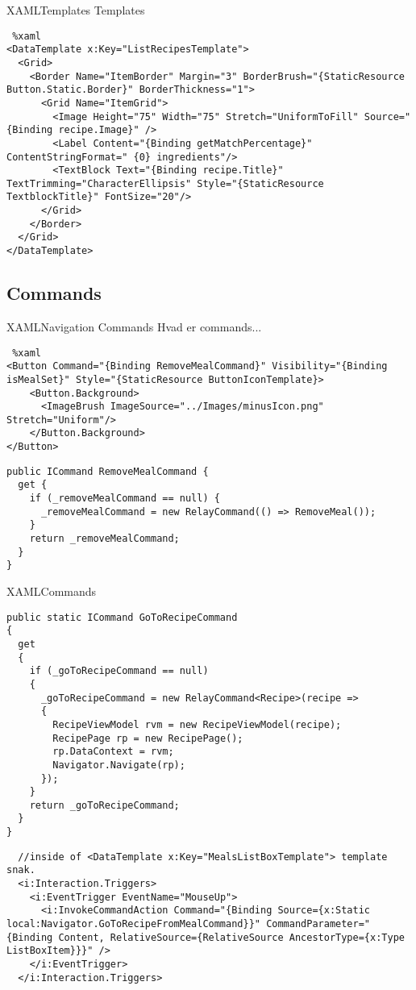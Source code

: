 \begin{frame}[fragile]{XAML}{Templates}
Templates
\begin{lstlisting} %xaml
<DataTemplate x:Key="ListRecipesTemplate">
  <Grid>
    <Border Name="ItemBorder" Margin="3" BorderBrush="{StaticResource Button.Static.Border}" BorderThickness="1">
      <Grid Name="ItemGrid">
        <Image Height="75" Width="75" Stretch="UniformToFill" Source="{Binding recipe.Image}" />
        <Label Content="{Binding getMatchPercentage}" ContentStringFormat=" {0} ingredients"/>
        <TextBlock Text="{Binding recipe.Title}" TextTrimming="CharacterEllipsis" Style="{StaticResource TextblockTitle}" FontSize="20"/>
      </Grid>
    </Border>
  </Grid>
</DataTemplate>
\end{lstlisting}
\end{frame}



\subsection{Commands} 
\begin{frame}[fragile]{XAML}{Navigation Commands}
Hvad er commands...

\begin{lstlisting} %xaml
<Button Command="{Binding RemoveMealCommand}" Visibility="{Binding isMealSet}" Style="{StaticResource ButtonIconTemplate}>
    <Button.Background>
      <ImageBrush ImageSource="../Images/minusIcon.png" Stretch="Uniform"/>
    </Button.Background>
</Button>
\end{lstlisting}

\begin{lstlisting}
public ICommand RemoveMealCommand {
  get {
    if (_removeMealCommand == null) {
      _removeMealCommand = new RelayCommand(() => RemoveMeal());
    }
    return _removeMealCommand;
  }
}
\end{lstlisting}
\end{frame}


\begin{frame}[fragile]{XAML}{Commands}
\begin{lstlisting}
public static ICommand GoToRecipeCommand
{
  get
  {
    if (_goToRecipeCommand == null)
    {
      _goToRecipeCommand = new RelayCommand<Recipe>(recipe =>
      {
        RecipeViewModel rvm = new RecipeViewModel(recipe);
        RecipePage rp = new RecipePage();
        rp.DataContext = rvm;
        Navigator.Navigate(rp);
      });
    }
    return _goToRecipeCommand;
  }
}
\end{lstlisting}

\begin{lstlisting}
  //inside of <DataTemplate x:Key="MealsListBoxTemplate"> template snak.
  <i:Interaction.Triggers>
    <i:EventTrigger EventName="MouseUp">
      <i:InvokeCommandAction Command="{Binding Source={x:Static local:Navigator.GoToRecipeFromMealCommand}}" CommandParameter="{Binding Content, RelativeSource={RelativeSource AncestorType={x:Type ListBoxItem}}}" />
    </i:EventTrigger>
  </i:Interaction.Triggers>
\end{lstlisting}
\end{frame}
